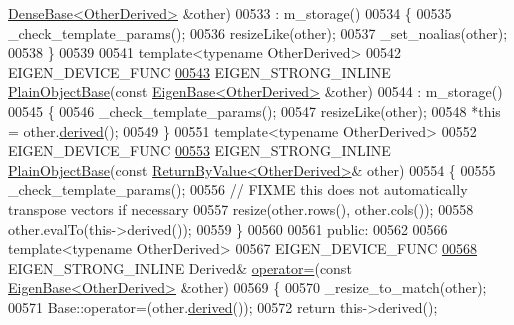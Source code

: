 \begin{DoxyCode}
      \hyperlink{group___core___module_class_eigen_1_1_dense_base}{DenseBase<OtherDerived>} &other)
00533       : m\_storage()
00534     \{
00535       \_check\_template\_params();
00536       resizeLike(other);
00537       \_set\_noalias(other);
00538     \}
00539 
00541     \textcolor{keyword}{template}<\textcolor{keyword}{typename} OtherDerived>
00542     EIGEN\_DEVICE\_FUNC
\hyperlink{class_eigen_1_1_plain_object_base_a31d65efdbeaf9c7693bf6ae204d788f2}{00543}     EIGEN\_STRONG\_INLINE \hyperlink{class_eigen_1_1_plain_object_base_a31d65efdbeaf9c7693bf6ae204d788f2}{PlainObjectBase}(\textcolor{keyword}{const} 
      \hyperlink{group___core___module_struct_eigen_1_1_eigen_base}{EigenBase<OtherDerived>} &other)
00544       : m\_storage()
00545     \{
00546       \_check\_template\_params();
00547       resizeLike(other);
00548       *\textcolor{keyword}{this} = other.\hyperlink{group___core___module_a324b16961a11d2ecfd2d1b7dd7946545}{derived}();
00549     \}
00551     \textcolor{keyword}{template}<\textcolor{keyword}{typename} OtherDerived>
00552     EIGEN\_DEVICE\_FUNC
\hyperlink{class_eigen_1_1_plain_object_base_abb80b2ee27de8b5d7ef2c8fb403c0068}{00553}     EIGEN\_STRONG\_INLINE \hyperlink{class_eigen_1_1_plain_object_base_abb80b2ee27de8b5d7ef2c8fb403c0068}{PlainObjectBase}(\textcolor{keyword}{const} 
      \hyperlink{group___core___module_class_eigen_1_1_return_by_value}{ReturnByValue<OtherDerived>}& other)
00554     \{
00555       \_check\_template\_params();
00556       \textcolor{comment}{// FIXME this does not automatically transpose vectors if necessary}
00557       resize(other.rows(), other.cols());
00558       other.evalTo(this->derived());
00559     \}
00560 
00561   \textcolor{keyword}{public}:
00562 
00566     \textcolor{keyword}{template}<\textcolor{keyword}{typename} OtherDerived>
00567     EIGEN\_DEVICE\_FUNC 
\hyperlink{class_eigen_1_1_plain_object_base_a6d280056e43429f043e8b25262ee6153}{00568}     EIGEN\_STRONG\_INLINE Derived& \hyperlink{class_eigen_1_1_plain_object_base_a6d280056e43429f043e8b25262ee6153}{operator=}(\textcolor{keyword}{const} 
      \hyperlink{group___core___module_struct_eigen_1_1_eigen_base}{EigenBase<OtherDerived>} &other)
00569     \{
00570       \_resize\_to\_match(other);
00571       Base::operator=(other.\hyperlink{group___core___module_a324b16961a11d2ecfd2d1b7dd7946545}{derived}());
00572       \textcolor{keywordflow}{return} this->derived();

\end{DoxyCode}
